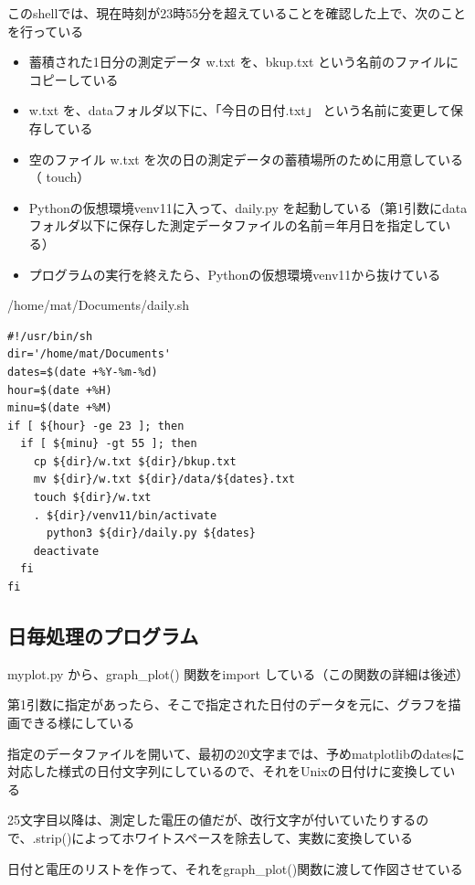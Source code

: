 \documentclass[12pt,a4paper,uplatex]{jsarticle}
\begin{document}
このshellでは、現在時刻が23時55分を超えていることを確認した上で、次のことを行っている
\begin{itemize}
	\item 蓄積された1日分の測定データ w.txt を、bkup.txt という名前のファイルにコピーしている
	\item w.txt を、dataフォルダ以下に、「今日の日付.txt」 という名前に変更して保存している
	\item 空のファイル w.txt を次の日の測定データの蓄積場所のために用意している（ touch）
	\item Pythonの仮想環境venv11に入って、daily.py を起動している（第1引数にdataフォルダ以下に保存した測定データファイルの名前＝年月日を指定している）
	\item プログラムの実行を終えたら、Pythonの仮想環境venv11から抜けている
\end{itemize}

\begin{itembox}[l]{/home/mat/Documents/daily.sh}
	\begin{verbatim}
#!/usr/bin/sh
dir='/home/mat/Documents'
dates=$(date +%Y-%m-%d)
hour=$(date +%H)
minu=$(date +%M)
if [ ${hour} -ge 23 ]; then
  if [ ${minu} -gt 55 ]; then
    cp ${dir}/w.txt ${dir}/bkup.txt
    mv ${dir}/w.txt ${dir}/data/${dates}.txt
    touch ${dir}/w.txt
    . ${dir}/venv11/bin/activate
      python3 ${dir}/daily.py ${dates}
    deactivate
  fi
fi
	\end{verbatim}
\end{itembox}


\subsection{日毎処理のプログラム}

	myplot.py から、graph\_plot() 関数をimport している（この関数の詳細は後述）
	
	第1引数に指定があったら、そこで指定された日付のデータを元に、グラフを描画できる様にしている
	
	指定のデータファイルを開いて、最初の20文字までは、予めmatplotlibのdatesに対応した様式の日付文字列にしているので、それをUnixの日付けに変換している
	
	25文字目以降は、測定した電圧の値だが、改行文字が付いていたりするので、.strip()によってホワイトスペースを除去して、実数に変換している
	
	日付と電圧のリストを作って、それをgraph\_plot()関数に渡して作図させている
\end{document}
